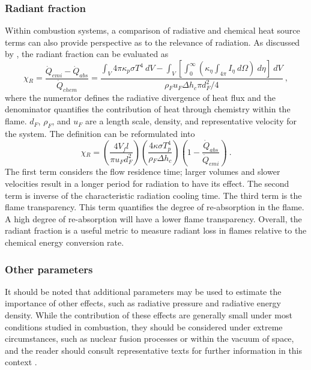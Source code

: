 \subsubsection{Radiant fraction}
Within combustion systems, a comparison of radiative and chemical heat source terms can also provide perspective as to the relevance of radiation. As discussed by \citet{Liu2020TheFlames}, the radiant fraction can be evaluated as
\begin{equation}
    \chi{}_R=\frac{\dot{Q}_{emi}-\dot{Q}_{abs}}{\dot{Q}_{chem}}=\frac{\int_V{4\pi{}\kappa{}_p\sigma{}T^4~dV}-\int_V\left[\int_0^\infty{\left(\kappa{}_\eta{}\int_{4\pi}I_\eta{}~d\Omega\right)~d\eta{}}\right]~dV}{\rho{}_Fu_F\Delta{h}_c\pi{}d_F^2/4} \ ,
    \label{eq:RadiantFraction}
\end{equation}
where the numerator defines the radiative divergence of heat flux and the denominator quantifies the contribution of heat through chemistry within the flame. $d_F$, $\rho_F$, and $u_F$ are a length scale, density, and representative velocity for the system.
The definition can be reformulated into 
\begin{equation}
    \chi{}_R=\left(\frac{4V_fl}{\pi{}u_Fd_F^2}\right)\left(\frac{4\kappa{}\sigma{}T_p^4}{\rho{}_F\Delta{h}_c}\right)\left(1-\frac{\dot{Q}_{abs}}{\dot{Q}_{emi}}\right) \ .
    \label{eq:RadiantFraction_reformulated}
\end{equation}
The first term considers the flow residence time; larger volumes and slower velocities result in a longer period for radiation to have its effect.
The second term is inverse of the characteristic radiation cooling time. 
The third term is the flame transparency. This term quantifies the degree of re-absorption in the flame. A high degree of re-absorption will have a lower flame transparency. Overall, the radiant fraction is a useful metric to measure radiant loss in flames relative to the chemical energy conversion rate.

\subsubsection{Other parameters}
It should be noted that additional parameters may be used to estimate the importance of other effects, such as radiative pressure and radiative energy density.
While the contribution of these effects are generally small under most conditions studied in combustion, they should be considered under extreme circumstances, such as nuclear fusion processes or within the vacuum of space, and the reader should consult representative texts for further information in this context \cite{Pai1966RadiationDynamics}.

